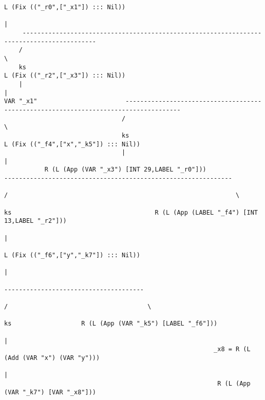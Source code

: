 \begin{landscape}
\begin{lstlisting}[basicstyle=\fontsize{6.5}{7.5}\selectfont\ttfamily]
                                                                          L (Fix (("_r0",["_x1"]) ::: Nil))
                                                                                          |
     ------------------------------------------------------------------------------------------
    /                                                                                          \
    ks                                                                         L (Fix (("_r2",["_x3"]) ::: Nil))
    |                                                                                          |
VAR "_x1"                        -------------------------------------------------------------------------------------
                                /                                                                                     \
                                ks                                                                  L (Fix (("_f4",["x","_k5"]) ::: Nil))
                                |                                                                                     |
           R (L (App (VAR "_x3") [INT 29,LABEL "_r0"]))                                        --------------------------------------------------------------
                                                                                              /                                                              \
                                                                                              ks                                       R (L (App (LABEL "_f4") [INT 13,LABEL "_r2"]))
                                                                                              |
                                                                            L (Fix (("_f6",["y","_k7"]) ::: Nil))
                                                                                              |
                                                                            --------------------------------------
                                                                           /                                      \
                                                                           ks                   R (L (App (VAR "_k5") [LABEL "_f6"]))
                                                                           |
                                                         _x8 = R (L (Add (VAR "x") (VAR "y")))
                                                                           |
                                                          R (L (App (VAR "_k7") [VAR "_x8"]))

\end{lstlisting}
\end{landscape}
\clearpage

